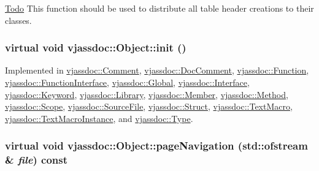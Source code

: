 \begin{Desc}
\item[\hyperlink{todo__todo000005}{Todo}]This function should be used to distribute all table header creations to their classes. \end{Desc}
\hypertarget{classvjassdoc_1_1Object_bd43e77dbe80055f5adda67661dfaca4}{
\subsubsection{\setlength{\rightskip}{0pt plus 5cm}virtual void vjassdoc::Object::init ()}}
\label{classvjassdoc_1_1Object_bd43e77dbe80055f5adda67661dfaca4}




Implemented in \hyperlink{classvjassdoc_1_1Comment_07ad51bf42ce397832b77eb96379c054}{vjassdoc::Comment}, \hyperlink{classvjassdoc_1_1DocComment_46ada773166611c9be898f74e0eb2315}{vjassdoc::DocComment}, \hyperlink{classvjassdoc_1_1Function_031d74f7df7c29afb36626fd335b2037}{vjassdoc::Function}, \hyperlink{classvjassdoc_1_1FunctionInterface_3b988163d8012beac222b27f80484242}{vjassdoc::FunctionInterface}, \hyperlink{classvjassdoc_1_1Global_9e6189cfd577f0453988e8c8c6eec04d}{vjassdoc::Global}, \hyperlink{classvjassdoc_1_1Interface_e10d2a4a6acf44897145bf76675b9da1}{vjassdoc::Interface}, \hyperlink{classvjassdoc_1_1Keyword_0aeec733c7c55ff51c8b1ba58af18ed9}{vjassdoc::Keyword}, \hyperlink{classvjassdoc_1_1Library_d1bbc6153d45c040be60419a6708bd7d}{vjassdoc::Library}, \hyperlink{classvjassdoc_1_1Member_eccac74ca5ea37e82d322c20b5aa2efc}{vjassdoc::Member}, \hyperlink{classvjassdoc_1_1Method_cd115b1b9a459752e6613925be8e9daf}{vjassdoc::Method}, \hyperlink{classvjassdoc_1_1Scope_fb5915ecd0cabc72508e7b7a09f0ef5c}{vjassdoc::Scope}, \hyperlink{classvjassdoc_1_1SourceFile_e2aa3f034bbb18de023ce9a21dfa78d1}{vjassdoc::SourceFile}, \hyperlink{classvjassdoc_1_1Struct_39dc86da31e526f3a6eb3b6e442156bb}{vjassdoc::Struct}, \hyperlink{classvjassdoc_1_1TextMacro_816bdd2b838a4f1148ea17e5723e8577}{vjassdoc::TextMacro}, \hyperlink{classvjassdoc_1_1TextMacroInstance_e60b03ce172f8eefde2cdcc31533ee2d}{vjassdoc::TextMacroInstance}, and \hyperlink{classvjassdoc_1_1Type_d4cadc76713790490c55be0bd0af1a1d}{vjassdoc::Type}.\hypertarget{classvjassdoc_1_1Object_736bbb6719edd8070d8f56c364a2764c}{
\subsubsection{\setlength{\rightskip}{0pt plus 5cm}virtual void vjassdoc::Object::pageNavigation (std::ofstream \& {\em file}) const}}
\label{classvjassdoc_1_1Object_736bbb6719edd8070d8f56c364a2764c}




